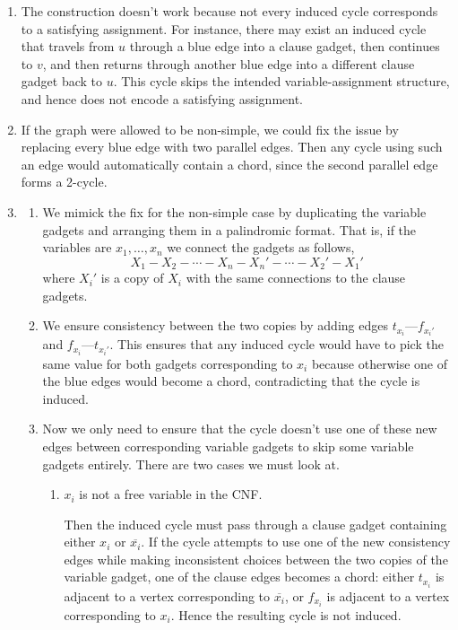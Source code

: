 \documentclass[12pt]{article}
\begin{document}
\begin{solution}
    \bbni
    \begin{enumerate}
        \item The construction doesn't work because not every induced cycle corresponds to a satisfying assignment. For instance, there may exist an induced cycle that travels from $u$ through a blue edge into a clause gadget, then continues to $v$, and then returns through another blue edge into a different clause gadget back to $u$. This cycle skips the intended variable-assignment structure, and hence does not encode a satisfying assignment.
        
        \item  If the graph were allowed to be non-simple, we could fix the issue by replacing every blue edge with two parallel edges. Then any cycle using such an edge would automatically contain a chord, since the second parallel edge forms a 2-cycle.

        \item \begin{enumerate}
            \item We mimick the fix for the non-simple case by duplicating the variable gadgets and arranging them in a palindromic format. That is, if the variables are $x_1, \ldots, x_n$ we connect the gadgets as follows, 
            \[ X_1 - X_2 - \cdots - X_n - X_n' - \cdots - X_2' - X_1'\]
            where $X_i'$ is a copy of $X_i$ with the same connections to the clause gadgets. 
            \item We ensure consistency between the two copies by adding edges $t_{x_i}$---$f_{x_i'}$ and $f_{x_i}$---$t_{x_i'}$. This ensures that any induced cycle would have to pick the same value for both gadgets corresponding to $x_i$ because otherwise one of the blue edges would become a chord, contradicting that the cycle is induced. 
            
            \item [(c, d)] Now we only need to ensure that the cycle doesn't use one of these new edges between corresponding variable gadgets to skip some variable gadgets entirely. There are two cases we must look at. 
            
            \begin{enumerate}
                \item $x_i$ is not a free variable in the CNF. 
                
                Then the induced cycle must pass through a clause gadget containing either $x_i$ or $\overline{x_i}$. If the cycle attempts to use one of the new consistency edges while making inconsistent choices between the two copies of the variable gadget, one of the clause edges becomes a chord: either $t_{x_i}$ is adjacent to a vertex corresponding to $\overline{x_i}$, or $f_{x_i}$ is adjacent to a vertex corresponding to $x_i$. Hence the resulting cycle is not induced.


\end{enumerate}
\end{enumerate}
\end{enumerate}
\end{solution}
\end{document}
